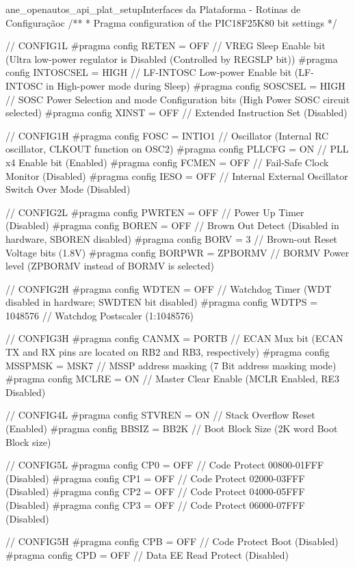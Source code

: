 \begin{algoritmo}{ane_openautos_api_plat_setup}{Interfaces da Plataforma - Rotinas de Configuração}{c}
/**
* Pragma configuration of the PIC18F25K80 bit settings
*/

// CONFIG1L
#pragma config RETEN = OFF      // VREG Sleep Enable bit (Ultra low-power regulator is Disabled (Controlled by REGSLP bit))
#pragma config INTOSCSEL = HIGH // LF-INTOSC Low-power Enable bit (LF-INTOSC in High-power mode during Sleep)
#pragma config SOSCSEL = HIGH   // SOSC Power Selection and mode Configuration bits (High Power SOSC circuit selected)
#pragma config XINST = OFF      // Extended Instruction Set (Disabled)

// CONFIG1H
#pragma config FOSC = INTIO1    // Oscillator (Internal RC oscillator, CLKOUT function on OSC2)
#pragma config PLLCFG = ON      // PLL x4 Enable bit (Enabled)
#pragma config FCMEN = OFF      // Fail-Safe Clock Monitor (Disabled)
#pragma config IESO = OFF       // Internal External Oscillator Switch Over Mode (Disabled)

// CONFIG2L
#pragma config PWRTEN = OFF     // Power Up Timer (Disabled)
#pragma config BOREN = OFF      // Brown Out Detect (Disabled in hardware, SBOREN disabled)
#pragma config BORV = 3         // Brown-out Reset Voltage bits (1.8V)
#pragma config BORPWR = ZPBORMV // BORMV Power level (ZPBORMV instead of BORMV is selected)

// CONFIG2H
#pragma config WDTEN = OFF      // Watchdog Timer (WDT disabled in hardware; SWDTEN bit disabled)
#pragma config WDTPS = 1048576  // Watchdog Postscaler (1:1048576)

// CONFIG3H
#pragma config CANMX = PORTB    // ECAN Mux bit (ECAN TX and RX pins are located on RB2 and RB3, respectively)
#pragma config MSSPMSK = MSK7   // MSSP address masking (7 Bit address masking mode)
#pragma config MCLRE = ON       // Master Clear Enable (MCLR Enabled, RE3 Disabled)

// CONFIG4L
#pragma config STVREN = ON      // Stack Overflow Reset (Enabled)
#pragma config BBSIZ = BB2K     // Boot Block Size (2K word Boot Block size)

// CONFIG5L
#pragma config CP0 = OFF        // Code Protect 00800-01FFF (Disabled)
#pragma config CP1 = OFF        // Code Protect 02000-03FFF (Disabled)
#pragma config CP2 = OFF        // Code Protect 04000-05FFF (Disabled)
#pragma config CP3 = OFF        // Code Protect 06000-07FFF (Disabled)

// CONFIG5H
#pragma config CPB = OFF        // Code Protect Boot (Disabled)
#pragma config CPD = OFF        // Data EE Read Protect (Disabled)


\end{algoritmo}
